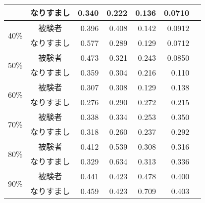 \begin{center}
\begin{longtable}[btph]{|c|c|r|r|r|r|r|}
           & なりすまし & 0.340 & 0.222 & 0.136 & 0.0710 & \\ \hline
      \multirow{2}{*}{40\%} & 被験者 & 0.396 & 0.408 & 0.142 & 0.0912 & \\ \cline{2-7}
           & なりすまし & 0.577 & 0.289 & 0.129 & 0.0712 & \\ \hline
      \multirow{2}{*}{50\%} & 被験者 & 0.473 & 0.321 & 0.243 & 0.0850 & \\ \cline{2-7}
           & なりすまし & 0.359 & 0.304 & 0.216 & 0.110 & \\ \hline
      \multirow{2}{*}{60\%} & 被験者 & 0.307 & 0.308 & 0.129 & 0.138 & \\ \cline{2-7}
           & なりすまし & 0.276 & 0.290 & 0.272 & 0.215 & \\ \hline
      \multirow{2}{*}{70\%} & 被験者 & 0.338 & 0.334 & 0.253 & 0.350 & \\ \cline{2-7}
           & なりすまし & 0.318 & 0.260 & 0.237 & 0.292 & \\ \hline
      \multirow{2}{*}{80\%} & 被験者 & 0.412 & 0.539 & 0.308 & 0.316 & \\ \cline{2-7}
           & なりすまし & 0.329 & 0.634 & 0.313 & 0.336 & \\ \hline
      \multirow{2}{*}{90\%} & 被験者 & 0.441 & 0.423 & 0.478 & 0.400 & \\ \cline{2-7}
           & なりすまし & 0.459 & 0.423 & 0.709 & 0.403 & \\ \hline
  \end{longtable}
\end{center}
